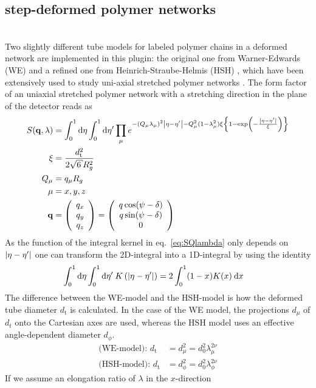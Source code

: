 \subsection{step-deformed polymer networks}
\label{sect:DeformedPolymerNetwork}
\hspace{1pt}\\
Two slightly different tube models for labeled polymer chains in a deformed network are implemented in this plugin: the original one from Warner-Edwards (WE) \cite{Warner1978} and a refined one from Heinrich-Straube-Helmis (HSH) \cite{Heinrich1988}, which have been extensively used to study uni-axial stretched polymer networks \cite{Straube1995,Mergell2001,Westermann2001,Westermann1999,Westermann1996,Read1997}.
The form factor of an uniaxial stretched polymer network with a stretching direction in the plane of the detector reads as
\begin{align}
\label{eq:SQlambda}
S(\mathbf{q},\lambda) &= \int_0^1\mathrm{d}\eta \int_0^1 \mathrm{d}\eta' \prod_{\mu} e^{-\left(Q_\mu\lambda_\mu\right)^2\abs{\eta-\eta'}-Q_\mu^2(1-\lambda_\mu^2)\xi\left\{1-\exp\left(-\frac{\abs{\eta-\eta'}}{\xi}\right)\right\}} \\
\xi &= \frac{d_\mathrm{t}^2}{2\sqrt{6}R_g^2} \\
Q_\mu &= q_\mu R_g\\
\mu  &= x,y,z \\
\mathbf{q} &= \Vek{q_x}{q_y}{q_z} = \Vek{q \cos(\psi-\delta)}{q\sin(\psi-\delta)}{0}
\end{align}
As the function of the integral kernel in eq.\ \ref{eq:SQlambda} only depends on ${\left\vert\eta-\eta'\right\vert}$ one can transform the 2D-integral into a 1D-integral by using the identity
\begin{align}
\label{eq:2D1D_int_identity}
\int_0^1\mathrm{d}\eta \int_0^1 \mathrm{d}\eta' \: K\left({\left\vert\eta-\eta'\right\vert}\right) &= 2 \int_0^1 (1-x)K(x)\: \mathrm{d}x
\end{align}
The difference between the WE-model and the HSH-model is how the deformed tube diameter $d_\mathrm{t}$ is calculated. In the case of the WE model, the projections $d_\mu$ of $d_t$ onto the Cartesian axes are used, whereas the HSH model uses an effective angle-dependent diameter $d_\phi$.
\begin{align}
\mbox{(WE-model): } d_\mathrm{t} &= d_\mu^2 = d_0^2\lambda_\mu^{2\nu} \\
\mbox{(HSH-model): } d_\mathrm{t} &= d_\phi^2 = d_0^2\lambda_\phi^{2\nu}
\end{align}
If we assume an elongation ratio of $\lambda$ in the $x$-direction
